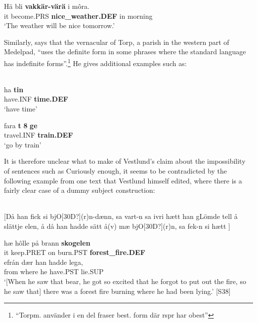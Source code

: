 \z

\ea
\gll Hä  bli  \textbf{vakkär-värä} i  môra.\\
it  become.PRS  \textbf{nice\_weather.DEF} in  morning\\
\glt ‘The weather will be nice tomorrow.’

\z

Similarly, \citet[140]{Bogren1921} says that the vernacular of Torp, a parish in the western part of Medelpad, “uses the definite form in some phrases where the standard language has indefinite forms”.\footnote{ “Torpm. använder i en del fraser best. form där rspr har obest”} He gives additional examples such as:

\ea\label{}
\\
\gll ha  \textbf{tin} \\
have.INF  \textbf{time.DEF} \\
\glt ‘have time’

\z

\ea
\gll fara  \textbf{t} \textbf{8} \textbf{ge}\\
travel.INF  \textbf{train.DEF}\\
\glt ‘go by train’

\z

It is therefore unclear what to make of Vestlund’s claim about the impossibility of sentences such as Curiously enough, it seems to be contradicted by the following example from one text that Vestlund himself edited, where there is a fairly clear case of a dummy subject construction:



\ea\label{}
\\
{}[Då han fick si bjO[30D?](r)n{}-dænn, sa vart-n sa ivri hætt han gLömde tell å slättje elen, å då han hadde sätt å(v) mæ bjO[30D?](r)n, sa fek-n si hætt ]

\gll 	hæ  hôlle  på  brann  \textbf{skogelen}\\
		it  keep.PRET  on  burn.PST  \textbf{forest\_fire.DEF}\\
\gll 	efrån  dær  han  hadde  lega,\\
		from  where  he   have.PST  lie.SUP\\
\glt  	‘[When he saw that bear, he got so excited that he forgot to put out the fire, so he saw that] there was a forest fire burning where he had been lying.’ [S38]


